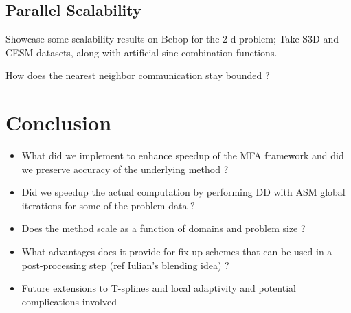 \documentclass[conference]{IEEEtran}
\begin{document}
\subsection{Parallel Scalability}

Showcase some scalability results on Bebop for the 2-d problem; Take S3D and CESM datasets, along with artificial sinc combination functions.

How does the nearest neighbor communication stay bounded ?




\section{Conclusion}

\begin{itemize}
	\item What did we implement to enhance speedup of the MFA framework and did we preserve accuracy of the underlying method ?
	\item Did we speedup the actual computation by performing DD with ASM global iterations for some of the problem data ?
	\item Does the method scale as a function of domains and problem size ? 
	\item What advantages does it provide for fix-up schemes that can be used in a post-processing step (ref Iulian's blending idea) ?
	\item Future extensions to T-splines and local adaptivity and potential complications involved
\end{itemize}
\end{document}
